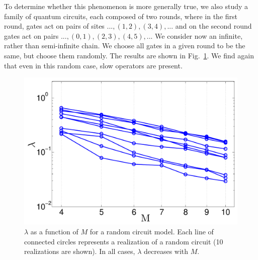 \documentclass[twocolumn,superscriptaddress, prb]{revtex4-1}
\begin{document}
To determine whether this phenomenon is more generally true, we also study a family of quantum circuits, each composed of two rounds, where in the first round, gates act on pairs of sites $...,(1,2),(3,4),...$ and on the second round gates act on pairs $...,(0,1),(2,3),(4,5),...$  We consider now an infinite, rather than semi-infinite chain.  We choose all gates in a given round to be the same, but choose them randomly.  The results are shown in Fig.~\ref{fig:lz}.  We find again that even in this random case, slow operators are present. %

\begin{figure}
\includegraphics[width=1.0\linewidth]{random_circuit_no_inset.pdf}
\centering
\caption{$\lambda$ as a function of $M$ for a random circuit model. Each line of connected circles represents a realization of a random circuit (10 realizations are shown). In all cases, $\lambda$ decreases with $M$.} %
\label{fig:lz}
\end{figure}
\end{document}

